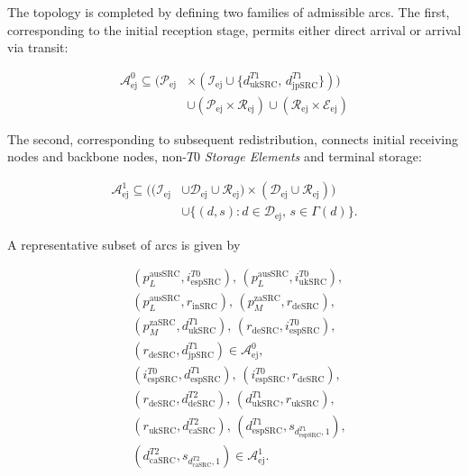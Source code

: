 \documentclass[a4paper,fleqn]{cas-dc}
\newcommand{\Pset}{\mathcal{P}}
\newcommand{\Iset}{\mathcal{I}}
\newcommand{\Dset}{\mathcal{D}}
\newcommand{\Eset}{\mathcal{E}}
\newcommand{\Rset}{\mathcal{R}}
\newcommand{\Apre}{\mathcal{A}^{0}}
\newcommand{\Apost}{\mathcal{A}^{1}}
\begin{document}
The topology is completed by defining two families of admissible arcs. The first, corresponding to the initial reception stage, permits either direct arrival or arrival via transit:

\begin{equation}
\nonumber
\begin{split}
\Apre_{\mathrm{ej}} \subseteq \bigl( \Pset_{\mathrm{ej}} &\times (\Iset_{\mathrm{ej}} \cup \{d_{\mathrm{ukSRC}}^{T1},\, d_{\mathrm{jpSRC}}^{T1}\}) \bigr) \\
&\cup (\Pset_{\mathrm{ej}} \times \Rset_{\mathrm{ej}}) \cup (\Rset_{\mathrm{ej}} \times \Eset_{\mathrm{ej}})
\end{split}
\end{equation}


The second, corresponding to subsequent redistribution, connects initial receiving nodes and backbone nodes, non-\(T0\) \emph{Storage Elements} and terminal storage:

\begin{equation}
\nonumber
\begin{split}
\Apost_{\mathrm{ej}} \subseteq \bigl( (\Iset_{\mathrm{ej}} &\cup \Dset_{\mathrm{ej}} \cup \Rset_{\mathrm{ej}}) \times (\Dset_{\mathrm{ej}} \cup \Rset_{\mathrm{ej}}) \bigr) \\
&\cup \bigl\{(d,s): d \in \Dset_{\mathrm{ej}},\, s \in \Gamma(d)\bigr\}.
\end{split}
\end{equation}

A representative subset of arcs is given by

\begin{align*}
& (p_L^{\mathrm{ausSRC}},i_{\mathrm{espSRC}}^{T0}),\,
  (p_L^{\mathrm{ausSRC}},i_{\mathrm{ukSRC}}^{T0}), \\
& (p_L^{\mathrm{ausSRC}},r_{\mathrm{inSRC}}),\,
  (p_M^{\mathrm{zaSRC}},r_{\mathrm{deSRC}}), \\
& (p_M^{\mathrm{zaSRC}},d_{\mathrm{ukSRC}}^{T1}),\,
  (r_{\mathrm{deSRC}},i_{\mathrm{espSRC}}^{T0}), \\
& (r_{\mathrm{deSRC}},d_{\mathrm{jpSRC}}^{T1}) \in \Apre_{\mathrm{ej}}, \\[1.5ex]
& (i_{\mathrm{espSRC}}^{T0},d_{\mathrm{espSRC}}^{T1}),\,
  (i_{\mathrm{espSRC}}^{T0},r_{\mathrm{deSRC}}), \\
& (r_{\mathrm{deSRC}},d_{\mathrm{deSRC}}^{T2}),\,
  (d_{\mathrm{ukSRC}}^{T1},r_{\mathrm{ukSRC}}), \\
& (r_{\mathrm{ukSRC}},d_{\mathrm{caSRC}}^{T2}),\,
  (d_{\mathrm{espSRC}}^{T1},s_{d_{\mathrm{espSRC}}^{T1},1}), \\
& (d_{\mathrm{caSRC}}^{T2},s_{d_{\mathrm{caSRC}}^{T2},1}) \in \Apost_{\mathrm{ej}}.
\end{align*}
\end{document}
